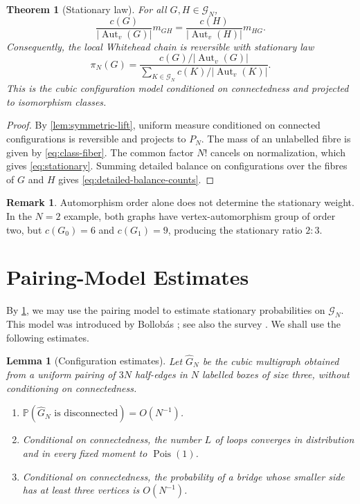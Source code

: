 \documentclass[11pt]{article}
\newcommand{\C}{\mathcal G}
\newcommand{\Pp}{\mathbb P}
\newcommand{\Aut}{\operatorname{Aut}}
\newcommand{\Pois}{\operatorname{Pois}}
\theoremstyle{plain}
\newtheorem{theorem}{Theorem}[section]
\newtheorem{lemma}[lemma]{Lemma}
\theoremstyle{definition}
\newtheorem{remark}[remark]{Remark}
\numberwithin{equation}{section}
\begin{document}
\begin{theorem}[Stationary law]\label{thm:stationary}
For all $G,H\in\C_N$,
\begin{equation}\label{eq:detailed-balance-counts}
  \frac{c(G)}{|\Aut_v(G)|}m_{GH}
  =
  \frac{c(H)}{|\Aut_v(H)|}m_{HG}.
\end{equation}
Consequently, the local Whitehead chain is reversible with stationary law
\begin{equation}\label{eq:stationary}
  \pi_N(G)=
  \frac{c(G)/|\Aut_v(G)|}
  {\displaystyle\sum_{K\in\C_N}c(K)/|\Aut_v(K)|}.
\end{equation}
This is the cubic configuration model conditioned on connectedness and
projected to isomorphism classes.
\end{theorem}

\begin{proof}
By \cref{lem:symmetric-lift}, uniform measure conditioned on connected
configurations is reversible and projects to $P_N$.  The mass of an unlabelled
fibre is given by \eqref{eq:class-fiber}.  The common factor $N!$ cancels on
normalization, which gives \eqref{eq:stationary}.  Summing detailed balance
on configurations over the fibres of $G$ and $H$ gives
\eqref{eq:detailed-balance-counts}.
\end{proof}

\begin{remark}
Automorphism order alone does not determine the stationary weight.  In the
$N=2$ example, both graphs have vertex-automorphism group of order two, but
$c(G_0)=6$ and $c(G_1)=9$, producing the stationary ratio $2:3$.
\end{remark}

\section{Pairing-Model Estimates}\label{sec:pairing}

By \cref{thm:stationary}, we may use the pairing model to estimate stationary
probabilities on $\C_N$.  This model was introduced by Bollob\'as
\cite{Bollobas1980}; see also the survey \cite{Wormald1999}.  We shall use the
following estimates.

\begin{lemma}[Configuration estimates]\label{lem:configuration-estimates}
Let $\widehat G_N$ be the cubic multigraph obtained from a uniform pairing of
$3N$ half-edges in $N$ labelled boxes of size three, without conditioning on
connectedness.

\begin{enumerate}
\item $\Pp(\widehat G_N\text{ is disconnected})=O(N^{-1})$.
\item Conditional on connectedness, the number $L$ of loops converges in
distribution and in every fixed moment to $\Pois(1)$.
\item Conditional on connectedness, the probability of a bridge whose smaller
side has at least three vertices is $O(N^{-1})$.
\end{enumerate}
\end{lemma}
\end{document}
